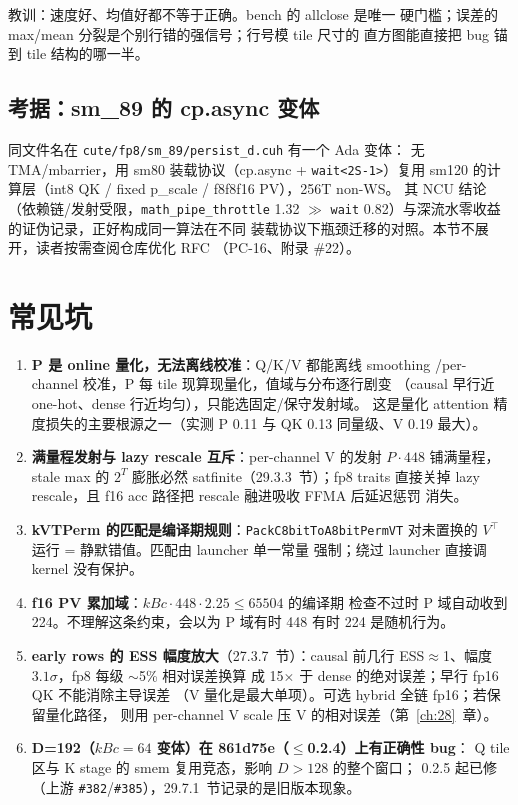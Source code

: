 教训：速度好、均值好都不等于正确。bench 的 allclose 是唯一
硬门槛；误差的 max/mean 分裂是个别行错的强信号；行号模 tile 尺寸的
直方图能直接把 bug 锚到 tile 结构的哪一半。

\subsection{考据：sm\_89 的 cp.async 变体}

同文件名在 \texttt{cute/fp8/sm\_89/persist\_d.cuh} 有一个 Ada 变体：
无 TMA/mbarrier，用 sm80 装载协议（cp.async + \texttt{wait<2S-1>}）复用
sm120 的计算层（int8 QK / fixed p\_scale / f8f8f16 PV），256T non-WS。
其 NCU 结论（依赖链/发射受限，\texttt{math\_pipe\_throttle} 1.32 $\gg$
\texttt{wait} 0.82）与深流水零收益的证伪记录，正好构成同一算法在不同
装载协议下瓶颈迁移的对照。本节不展开，读者按需查阅仓库优化 RFC
（PC-16、附录 \#22）。

\section{常见坑}

\begin{enumerate}[itemsep=1pt,topsep=2pt]
  \item \textbf{P 是 online 量化，无法离线校准}：Q/K/V 都能离线 smoothing
        /per-channel 校准，P 每 tile 现算现量化，值域与分布逐行剧变
        （causal 早行近 one-hot、dense 行近均匀），只能选固定/保守发射域。
        这是量化 attention 精度损失的主要根源之一（实测 P 0.11 与 QK 0.13
        同量级、V 0.19 最大）。
  \item \textbf{满量程发射与 lazy rescale 互斥}：per-channel V 的发射
        $P\cdot448$ 铺满量程，stale max
        的 $2^T$ 膨胀必然 satfinite（29.3.3~节）；fp8 traits 直接关掉
        lazy rescale，且 f16 acc 路径把 rescale 融进吸收 FFMA 后延迟惩罚
        消失。
  \item \textbf{kVTPerm 的匹配是编译期规则}：\texttt{PackC8bitToA8bitPermVT}
        对未置换的 $V^{\top}$ 运行 = 静默错值。匹配由 launcher 单一常量
        强制；绕过 launcher 直接调 kernel 没有保护。
  \item \textbf{f16 PV 累加域}：$kBc\cdot448\cdot2.25\le65504$ 的编译期
        检查不过时 P 域自动收到 224。不理解这条约束，会以为 P 域有时
        448 有时 224 是随机行为。
  \item \textbf{early rows 的 ESS 幅度放大}（27.3.7~节）：causal 前几行
        ESS$\approx$1、幅度 $3.1\sigma$，fp8 每级 $\sim$5\% 相对误差换算
        成 15$\times$ 于 dense 的绝对误差；早行 fp16 QK 不能消除主导误差
        （V 量化是最大单项）。可选 hybrid 全链 fp16；若保留量化路径，
        则用 per-channel V scale 压 V 的相对误差（第~\ref{ch:28}~章）。
  \item \textbf{D=192（$kBc{=}64$ 变体）在 861d75e（$\le$0.2.4）上有正确性 bug}：
        Q tile 区与 K stage 的 smem 复用竞态，影响 $D>128$ 的整个窗口；
        0.2.5 起已修（上游 \texttt{\#382}/\texttt{\#385}），29.7.1~节记录的是旧版本现象。
\end{enumerate}

